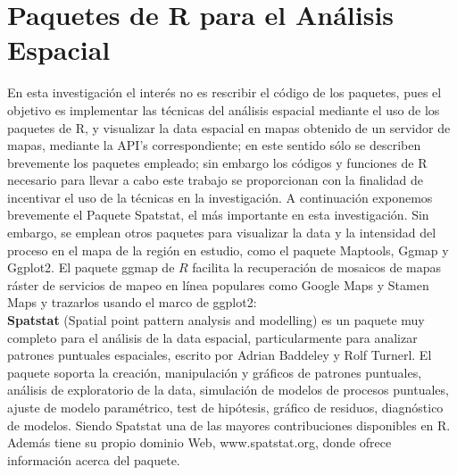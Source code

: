 \documentclass[12pt]{report}
\begin{document}
			
			
			
				
		
			
			
			
			\section{Paquetes de R para el Análisis Espacial}{\label{R1} }
			
			
		En esta investigación el interés no es  rescribir el código de los paquetes, pues el objetivo es implementar las técnicas del análisis espacial mediante el uso de los paquetes de R, y  visualizar la data espacial en mapas obtenido de un servidor de mapas, mediante la API's  correspondiente;  en este sentido sólo se describen brevemente los paquetes empleado; sin embargo los códigos y funciones de R  necesario para llevar a cabo este trabajo se proporcionan con la finalidad de incentivar el uso de la técnicas en la investigación. A continuación exponemos brevemente el Paquete Spatstat, el más importante en esta investigación. Sin embargo, se emplean otros paquetes para visualizar la data y la intensidad del proceso en el mapa de la región en estudio, como el paquete Maptools,  Ggmap y Ggplot2.  El paquete ggmap de $R$ facilita la recuperación de mosaicos de mapas ráster de servicios de mapeo en línea populares como Google Maps y Stamen Maps y trazarlos usando el marco de ggplot2:  \\ 
			
			\textbf{Spatstat} (Spatial point pattern analysis and modelling)  es un paquete muy completo para el análisis de la data espacial, particularmente para analizar patrones puntuales espaciales, escrito por Adrian Baddeley\cite{Badbeley}   y  Rolf Turnerl. El paquete soporta la creación, manipulación y gráficos de patrones puntuales, análisis de exploratorio de la data, simulación de modelos de procesos puntuales, ajuste de modelo paramétrico, test de hipótesis, gráfico de residuos, diagnóstico de modelos. Siendo Spatstat  una de las  mayores contribuciones  disponibles  en R. Además tiene su propio dominio Web, www.spatstat.org, donde ofrece información acerca del paquete.\\   
			  
\end{document}

